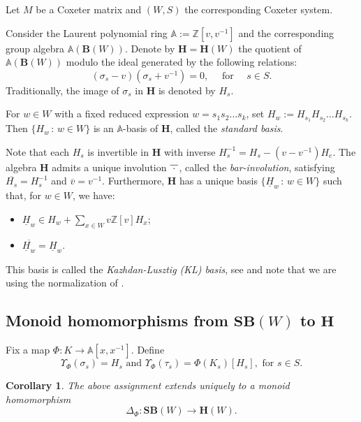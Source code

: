 \documentclass[a4paper]{amsart}
\newtheorem{corollary}[theorem]{Corollary}
\begin{document}
Let $M$ be a Coxeter matrix and $(W,S)$ the corresponding Coxeter system. 

Consider the Laurent polynomial  ring
$\mathbb{A}:=\mathbb{Z}[v,v^{-1}]$ and the corresponding group algebra
$\mathbb{A}(\mathbf{B}(W))$. Denote by $\mathbf{H}=\mathbf{H}(W)$
the quotient of $\mathbb{A}(\mathbf{B}(W))$ modulo the ideal
generated by the following relations:
\begin{displaymath}
(\sigma_s-v)(\sigma_s+v^{-1})=0,\quad \text{ for }\quad s\in S.
\end{displaymath}
Traditionally, the image of $\sigma_s$  in $\mathbf{H}$ is
denoted by $H_s$.

For $w\in W$ with a fixed reduced expression $w=s_1s_2\dots s_k$,
set $H_w:=H_{s_1}H_{s_2}\dots H_{s_k}$. Then 
$\{H_w\,:\, w\in W\}$ is an $\mathbb{A}$-basis of $\mathbf{H}$,
called the {\em standard basis}. 

Note that each $H_s$ is invertible in $\mathbf{H}$ with inverse 
$H_s^{-1}=H_s-(v-v^{-1})H_e$.
The algebra $\mathbf{H}$ admits a unique involution $\overline{\hspace{1mm}\cdot\hspace{1mm}}$, 
called the {\em bar-involution}, satisfying $\overline{H_s}=H_s^{-1}$
and $\overline{v}=v^{-1}$. Furthermore, $\mathbf{H}$ has a unique basis
$\{\underline{H}_w\,:\,  w\in W\}$ such that, for $w\in W$, we have:
\begin{itemize}
\item $\displaystyle\underline{H}_w\in H_w+\sum_{x\in W}v\mathbb{Z}[v]H_x$;
\item $\overline{\underline{H}_w}=\underline{H}_w$.
\end{itemize}
This basis is called the {\em Kazhdan-Lusztig (KL) basis}, see \cite{KL}
and note that we are using the normalization of \cite{So2}.

\subsection{Monoid homomorphisms from $\mathbf{SB}(W)$ to $\mathbf{H}$}\label{s9.2}

Fix a map $\Phi:K\to \mathbb{A}[x,x^{-1}]$. Define
\begin{displaymath}
\Upsilon_\Phi(\sigma_s)=H_s\text{ and }
\Upsilon_\Phi(\tau_s)=\Phi(K_s)[H_s],\text{ for }s\in S.
\end{displaymath}

\begin{corollary}\label{corn9.2.1}
The above assignment extends uniquely to a monoid homomorphism
$$\Delta_\Phi:\mathbf{SB}(W)\to \mathbf{H}(W).$$
\end{corollary}
\end{document}
